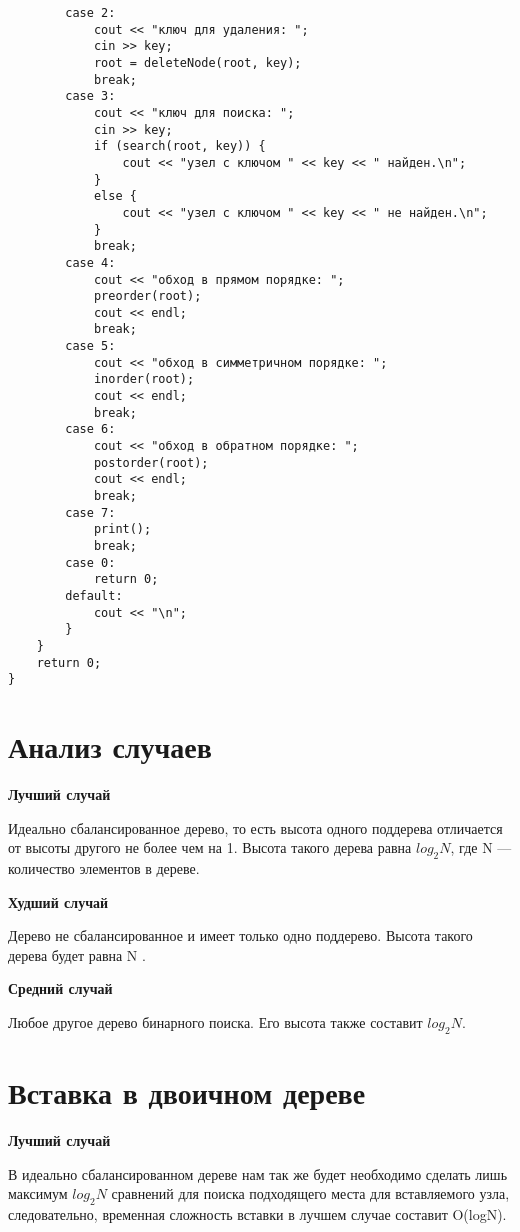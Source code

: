 \documentclass[bachelor, och, referat, times]{SCWorks}
\begin{document}
\begin{verbatim}
        case 2:
            cout << "ключ для удаления: ";
            cin >> key;
            root = deleteNode(root, key);
            break;
        case 3:
            cout << "ключ для поиска: ";
            cin >> key;
            if (search(root, key)) {
                cout << "узел с ключом " << key << " найден.\n";
            }
            else {
                cout << "узел с ключом " << key << " не найден.\n";
            }
            break;
        case 4:
            cout << "обход в прямом порядке: ";
            preorder(root);
            cout << endl;
            break;
        case 5:
            cout << "обход в симметричном порядке: ";
            inorder(root);
            cout << endl;
            break;
        case 6:
            cout << "обход в обратном порядке: ";
            postorder(root);
            cout << endl;
            break;
        case 7:
            print();
            break;
        case 0:
            return 0;
        default:
            cout << "\n";
        }
    }
    return 0;
}
 \end{verbatim}


 \section{Анализ случаев}



\textbf{ Лучший случай}

Идеально сбалансированное дерево, 
то есть высота одного поддерева отличается от высоты другого не более чем на 1. 
Высота такого дерева равна $log_2 N$, где N — количество элементов в дереве.
\vspace{5mm}

\textbf{Худший случай}

Дерево не сбалансированное и имеет только одно поддерево. 
Высота такого дерева будет равна N .
\vspace{5mm}

\textbf{Средний случай}

Любое другое дерево бинарного поиска. Его высота также составит
$log_2N$.


\section{Вставка в двоичном дереве}

\textbf{ Лучший случай}

В идеально сбалансированном дереве нам так же будет необходимо сделать 
лишь максимум $log_2N$ сравнений для поиска подходящего места для вставляемого узла, 
следовательно, временная сложность вставки в лучшем случае составит O(logN).
\vspace{5mm}
\end{document}
